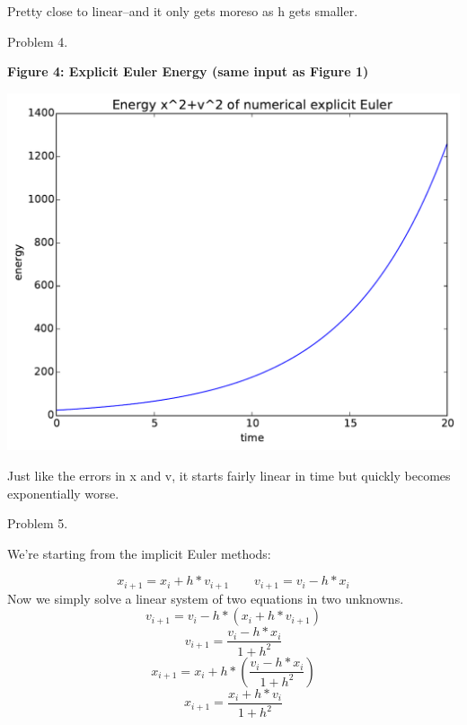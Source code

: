\documentclass{article}
\begin{document}
Pretty close to linear--and it only gets moreso as h gets smaller.

\bigskip

\clearpage

Problem 4.

\begin{center}
    \textbf{Figure 4: Explicit Euler Energy (same input as Figure 1)}\par\medskip
    \includegraphics[scale=1.0]{eE_energy}
\end{center}

Just like the errors in x and v, it starts fairly linear in time but quickly becomes exponentially worse.


\bigskip

Problem 5.

We're starting from the implicit Euler methods:

\begin{equation}
    x_{i+1} = x_{i} + h*v_{i+1}  \qquad   v_{i+1} = v_{i} - h*x_{i}
\end{equation}
Now we simply solve a linear system of two equations in two unknowns.
\begin{equation}
    v_{i+1} = v_{i} - h*(x_{i} + h*v_{i+1})
\end{equation}
\begin{equation}
    v_{i+1} = \frac{v_{i} - h*x_{i}}{1 + h^2}
\end{equation}
\begin{equation}
    x_{i+1} = x_{i} + h*(\frac{v_{i} - h*x_{i}}{1 + h^2})
\end{equation}
\begin{equation}
    x_{i+1} = \frac{x_{i} + h*v_{i}}{1 + h^2}
\end{equation}
\end{document}
